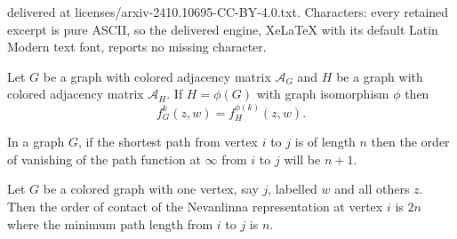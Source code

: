\documentclass[10pt,a4paper]{amsart}
\newcommand{\cA}{\mathcal{A}}
\begin{document}
delivered at licenses/arxiv-2410.10695-CC-BY-4.0.txt. Characters: every retained excerpt is pure ASCII, so the delivered engine, XeLaTeX with its default Latin Modern text font, reports no missing character.
\begin{lemma}\label{relabel}
    Let $G$ be a graph with colored adjacency matrix $\cA_G$ and $H$ be a graph with colored adjacency matrix $\mathcal{A}_H$. If $H = \phi(G)$ with graph isomorphism $\phi$ then 
    $$f^k_G(z,w) = f^{\phi(k)}_H(z,w).$$
\end{lemma}

\begin{lemma} \label{pathorder}
    In a graph $G$, if the shortest path from vertex $i$ to $j$ is of length $n$ then the order of vanishing of the path function at $\infty$ from $i$ to $j$ will be $n+1$.
\end{lemma}

\begin{theorem}\label{contactorder}
Let $G$ be a colored graph with one vertex, say $j$, labelled $w$ and all others $z$. Then the order of contact of the Nevanlinna representation at vertex $i$ is $2n$ where the minimum path length from $i$ to $j$ is $n$.
\end{theorem}
\end{document}

